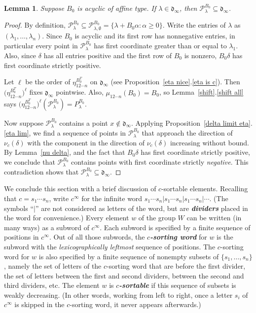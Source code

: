 \documentclass{amsart}
\newtheorem{lemma}[proposition]{Lemma}
\theoremstyle{definition}
\theoremstyle{remark}
\numberwithin{equation}{section}
\newcommand{\newword}[1]{\textbf{\emph{#1}}}
\newcommand{\set}[1]{{\lbrace #1 \rbrace}}
\newcommand{\0}{{\mathbf{0}}}
\renewcommand{\P}{\mathcal{P}}
\renewcommand{\d}{{\mathfrak d}}
\begin{document}
\begin{lemma}\label{P in dinf}
Suppose $B_0$ is acyclic of affine type.
If $\lambda\in\d_\infty$, then $\P^{B_0}_\lambda\subseteq\d_\infty$.
\end{lemma}
\begin{proof}
By definition, $\P^{B_0}_\lambda\subseteq\P^{B_0}_{\lambda,\emptyset}=\set{\lambda+B_0\alpha:\alpha\ge0}$.
Write the entries of $\lambda$ as $(\lambda_1,\ldots,\lambda_n)$.
Since $B_0$ is acyclic and its first row has nonnegative entries, in particular every point in $\P^{B_0}_\lambda$ has first coordinate greater than or equal to $\lambda_1$.
Also, since $\delta$ has all entries positive and the first row of $B_0$ is nonzero, $B_0\delta$ has first coordinate strictly positive.

Let $\ell$ be the order of $\eta^{B_0^T}_{12\cdots n}$ on $\d_\infty$ (see Proposition~\ref{eta nice}.\ref{eta is c}).
Then $\bigl(\eta^{B_0^T}_{12\cdots n}\bigr)^\ell$ fixes $\d_\infty$ pointwise.
Also, $\mu_{12\cdots n}(B_0)=B_0$, so Lemma~\ref{shift}.\ref{shift all} says ${\bigl(\eta^{B_0^T}_{12\cdots n}\bigr)^\ell(\P_\lambda^{B_0})=P_\lambda^{B_0}}$.

Now suppose $\P^{B_0}_\lambda$ contains a point $x\not\in\d_\infty$.
Applying Proposition~\ref{delta limit eta}.\ref{eta lim}, we find a sequence of points in $\P^{B_0}_\lambda$ that approach the direction of $\nu_c(\delta)$ with the component in the direction of $\nu_c(\delta)$ increasing without bound.
By Lemma~\ref{nu delta}, and the fact that $B_0\delta$ has first coordinate strictly positive, we conclude that $\P^{B_0}_\lambda$ contains points with first coordinate strictly \emph{negative}.
This contradiction shows that $\P^{B_0}_\lambda\subseteq\d_\infty$.
\end{proof}

We conclude this section with a brief discussion of $c$-sortable elements.  
Recalling that $c=s_1\cdots s_n$, write $c^\infty$ for the infinite word $s_1\cdots s_n|s_1\cdots s_n|s_1\cdots s_n|\cdots$.
(The symbols ``$|$'' are not considered as letters of the word, but are \newword{dividers} placed in the word for convenience.)
Every element $w$ of the group $W$ can be written (in many ways) as a subword of $c^\infty$.
Each subword is specified by a finite sequence of positions in $c^\infty$.
Out of all those subwords, the \newword{$c$-sorting word} for $w$ is the subword with the \emph{lexicographically leftmost} sequence of positions.
The $c$-sorting word for $w$ is also specified by a finite sequence of nonempty subsets of $\set{s_1,\ldots,s_n}$, namely the set of letters of the $c$-sorting word that are before the first divider, the set of letters between the first and second dividers, between the second and third dividers, etc.
The element $w$ is \newword{$c$-sortable} if this sequence of subsets is weakly decreasing.
(In other words, working from left to right, once a letter $s_i$ of $c^\infty$ is skipped in the $c$-sorting word, it never appears afterwards.)
\end{document}
